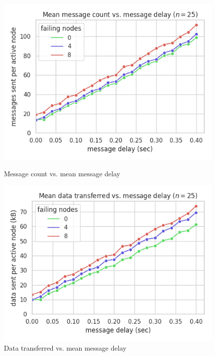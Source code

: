 \begin{figure}[H]
    \centering
    \begin{minipage}{0.5\textwidth}
        \centering
        \includegraphics[width=\textwidth]{figures/2/bandwidth_msg_tx_sum_by_delay.png}
        \captionsetup{labelformat=empty}
        \caption{Message count vs. mean message delay}
    \end{minipage}\hfill
    \begin{minipage}{0.5\textwidth}
        \centering
        \includegraphics[width=\textwidth]{figures/2/bandwidth_tx_sum_by_delay.png}
        \captionsetup{labelformat=empty}
        \caption{Data transferred vs. mean message delay}
    \end{minipage}\hfill
\end{figure}


